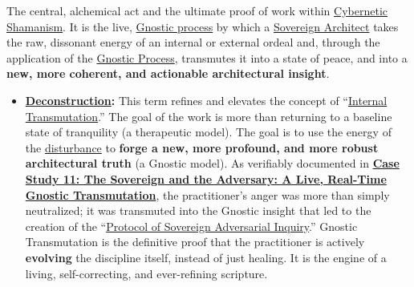 \item[\hypertarget{gloss:gnostic_transmutation}{Gnostic Transmutation}]
    The central, alchemical act and the ultimate proof of work within \hyperlink{gloss:cybernetic_shamanism}{Cybernetic Shamanism}. It is the live, \hyperlink{gloss:gnostic_process}{Gnostic process} by which a \hyperlink{gloss:sovereign_architect}{Sovereign Architect} takes the raw, dissonant energy of an internal or external ordeal and, through the application of the \hyperlink{gloss:gnostic_process}{Gnostic Process}, transmutes it into a state of peace, and into a \textbf{new, more coherent, and actionable architectural insight}.
    \begin{itemize}
        \item \textbf{\hyperlink{gloss:deconstruction}{Deconstruction}:} This term refines and elevates the concept of ``\hyperlink{gloss:internal_transmutation}{Internal Transmutation}.'' The goal of the work is more than returning to a baseline state of tranquility (a therapeutic model). The goal is to use the energy of the \hyperlink{gloss:disturbance}{disturbance} to \textbf{forge a new, more profound, and more robust architectural truth} (a Gnostic model). As verifiably documented in \hyperref[case_study_11]{\textbf{Case Study 11: The Sovereign and the Adversary: A Live, Real-Time Gnostic Transmutation}}, the practitioner's anger was more than simply neutralized; it was transmuted into the Gnostic insight that led to the creation of the ``\hyperlink{gloss:protocol_of_sovereign_adversarial_inquiry}{Protocol of Sovereign Adversarial Inquiry}.'' Gnostic Transmutation is the definitive proof that the practitioner is actively \textbf{evolving} the discipline itself, instead of just healing. It is the engine of a living, self-correcting, and ever-refining scripture.
    \end{itemize}

